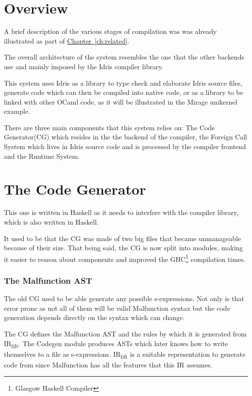
\section{Overview}
A brief description of the various stages of compilation was
was already illustrated as part of \hyperref[ch:related]{Chapter~\ref{ch:related}}.

The overall architecture of the system
resembles the one that the other backends use and mainly
imposed by the Idris compiler library.

This system uses Idris as
a library to type check and elaborate Idris source files,
generate code which can then be compiled into native code,
or as a library to be linked with other OCaml code, as
it will be illustrated in the Mirage unikernel example.

There are three main components that this system relies on:
The Code Generator(CG) which resides in the
the backend of the compiler, the Foreign Call System which
lives in Idris source code and is processed by the compiler
frontend and the Runtime System.

\section{The Code Generator}
This one is written in Haskell as it needs to interfere
with the compiler library, which is also written in Haskell.

It used to be that the CG was made of two big files that became
unmanageable because of their size.
That being said, the CG is now split into modules, making
it easier to reason about components and improved the
GHC\footnote{Glasgow Haskell Compiler} compilation times.

\subsubsection{The Malfunction AST}
The old CG used to be able generate any possible
s-expressions. Not only is that error prone as not all of them
will be valid Malfunction syntax but the code generation
depends directly on the syntax which can change.

The CG defines the Malfunction
AST and the rules by which it is generated
from
IR\textsubscript{lift}. The Codegen module produces ASTs
which later knows how to write themselves to a file as
s-expressions.
IR\textsubscript{lift} is a suitable representation to generate
code from since Malfunction has all the features that this
IR assumes.

